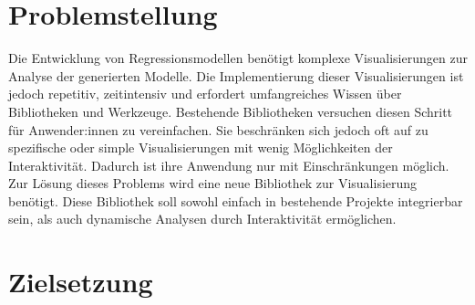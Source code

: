 \section{Problemstellung}
\label{sec:Problemstellung}

Die Entwicklung von Regressionsmodellen benötigt komplexe Visualisierungen zur Analyse der generierten Modelle. Die Implementierung dieser Visualisierungen ist jedoch repetitiv, zeitintensiv und erfordert umfangreiches Wissen über Bibliotheken und Werkzeuge. Bestehende Bibliotheken versuchen diesen Schritt für Anwender:innen zu vereinfachen. Sie beschränken sich jedoch oft auf zu spezifische oder simple Visualisierungen mit wenig Möglichkeiten der Interaktivität. Dadurch ist ihre Anwendung nur mit Einschränkungen möglich. Zur Lösung dieses Problems wird eine neue Bibliothek zur Visualisierung benötigt. Diese Bibliothek soll sowohl einfach in bestehende Projekte integrierbar sein, als auch dynamische Analysen durch Interaktivität ermöglichen.


\clearpage

\section{Zielsetzung}
\label{sec:Zielsetzung}



